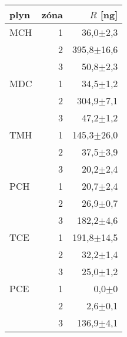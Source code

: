 \begin{tabular}{lrr}
\toprule
plyn & zóna & $R$ [\si{ng}]               \\
\midrule
MCH & 1 &    36,0$\pm$2,3 \\
    & 2 &  395,8$\pm$16,6 \\
    & 3 &    50,8$\pm$2,3 \\
MDC & 1 &    34,5$\pm$1,2 \\
    & 2 &   304,9$\pm$7,1 \\
    & 3 &    47,2$\pm$1,2 \\
TMH & 1 &  145,3$\pm$26,0 \\
    & 2 &    37,5$\pm$3,9 \\
    & 3 &    20,2$\pm$2,4 \\
PCH & 1 &    20,7$\pm$2,4 \\
    & 2 &    26,9$\pm$0,7 \\
    & 3 &   182,2$\pm$4,6 \\
TCE & 1 &  191,8$\pm$14,5 \\
    & 2 &    32,2$\pm$1,4 \\
    & 3 &    25,0$\pm$1,2 \\
PCE & 1 &       0,0$\pm$0 \\
    & 2 &     2,6$\pm$0,1 \\
    & 3 &   136,9$\pm$4,1 \\
\bottomrule
\end{tabular}

